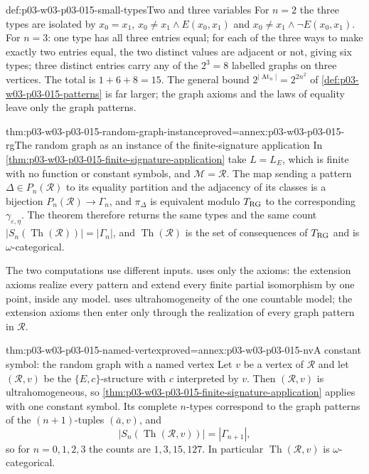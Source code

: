 \begin{hbexample}{def:p03-w03-p03-015-small-types}{Two and three variables}
For \(n=2\) the three types are isolated by \(x_0=x_1\),
\(x_0\neq x_1\land E(x_0,x_1)\) and \(x_0\neq x_1\land\neg E(x_0,x_1)\).
For \(n=3\): one type has all three entries equal; for each of the three
ways to make exactly two entries equal, the two distinct values are
adjacent or not, giving six types; three distinct entries carry any of the
\(2^3=8\) labelled graphs on three vertices. The total is \(1+6+8=15\).
The general bound \(2^{|\operatorname{At}_n|}=2^{2n^2}\) of
\cref{def:p03-w03-p03-015-patterns} is far larger; the graph axioms and
the laws of equality leave only the graph patterns.
\end{hbexample}

\begin{hbtheorem}{thm:p03-w03-p03-015-random-graph-instance}{proved=annex:p03-w03-p03-015-rg}{The random graph as an instance of the finite-signature application}
In \cref{thm:p03-w03-p03-015-finite-signature-application} take
\(L=L_E\), which is finite with no function or constant symbols, and
\(\mathcal M=\mathcal R\). The map sending a pattern
\(\Delta\in P_n(\mathcal R)\) to its equality partition and the adjacency
of its classes is a bijection \(P_n(\mathcal R)\to\Gamma_n\), and
\(\pi_\Delta\) is equivalent modulo \(T_{\rm RG}\) to the corresponding
\(\gamma_{\varepsilon,\eta}\). The theorem therefore returns the same
types and the same count \(|S_n(\operatorname{Th}(\mathcal R))|=|\Gamma_n|\),
and \(\operatorname{Th}(\mathcal R)\) is the set of consequences of
\(T_{\rm RG}\) and is \(\omega\)-categorical.
\end{hbtheorem}

The two computations use different inputs. 
uses only the axioms: the extension axioms realize every pattern and
extend every finite partial isomorphism by one point, inside any model.
 uses ultrahomogeneity of
the one countable model; the extension axioms then enter only through the
realization of every graph pattern in \(\mathcal R\).

\begin{hbtheorem}{thm:p03-w03-p03-015-named-vertex}{proved=annex:p03-w03-p03-015-nv}{A constant symbol: the random graph with a named vertex}
Let \(v\) be a vertex of \(\mathcal R\) and let \((\mathcal R,v)\) be the
\(\{E,c\}\)-structure with \(c\) interpreted by \(v\). Then
\((\mathcal R,v)\) is ultrahomogeneous, so
\cref{thm:p03-w03-p03-015-finite-signature-application} applies with one
constant symbol. Its complete \(n\)-types correspond to the graph patterns
of the \((n+1)\)-tuples \((\bar a,v)\), and
\[
 |S_n(\operatorname{Th}(\mathcal R,v))|=|\Gamma_{n+1}|,
\]
so for \(n=0,1,2,3\) the counts are \(1,3,15,127\).
In particular \(\operatorname{Th}(\mathcal R,v)\) is \(\omega\)-categorical.
\end{hbtheorem}

